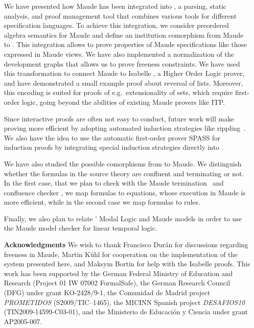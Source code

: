 
We have presented how Maude has been integrated into
\Hets, a parsing, static analysis, and proof management tool that
combines various tools for different specification languages. To
achieve this integration, we consider preordered algebra semantics for
Maude and define an institution comorphism from Maude to \CASL.  This
integration allows to prove properties of Maude specifications like
those expressed in Maude views. We have also implemented a
normalization of the development graphs that allows us to prove
freeness constraints. We have used this transformation to connect
Maude to Isabelle \cite{Isabelle02}, a Higher Order Logic prover, and
have demonstrated a small example proof about reversal of lists.
Moreover, this encoding is suited for proofs of e.g.\ extensionality
of sets, which require first-order logic, going beyond the abilities
of existing Maude provers like ITP.

Since interactive proofs are often not easy to conduct, future work
will make proving more efficient by adopting automated induction
strategies like rippling~\cite{DBLP:conf/tphol/DixonF04}.  We also
have the idea to use the automatic first-order prover SPASS for
induction proofs by integrating special induction strategies directly
into \Hets.

We have also studied the possible comorphisms from \CASL to Maude. We
distinguish whether the formulas in the source theory are confluent and
terminating or not. In the first case, that we plan to check with the
Maude termination~\cite{MTT08} and confluence checker \cite{ChurchRoss10},
we map formulas to equations,
whose execution in Maude is more efficient, while in the second case
we map formulas to rules.

Finally, we also plan to relate \Hets' Modal Logic and Maude models in order to use
the Maude model checker \cite[Chapter 13]{maude-book} for linear temporal
logic.

\vspace{2ex}

\textbf{Acknowledgments} We wish to thank Francisco Dur\'an for discussions 
regarding freeness in Maude, Martin K\"uhl for cooperation
on the implementation of the system presented here,
and Maksym Bortin for help with the Isabelle proofs.
This work has been
supported by the German Federal Ministry of Education and Research
(Project 01 IW 07002 FormalSafe), the German Research Council (DFG)
under grant KO-2428/9-1, the Comunidad de Madrid project \emph{PROMETIDOS}
(S2009/TIC--1465), the MICINN Spanish project
\emph{DESAFIOS10} (TIN2009-14599-C03-01), and the Ministerio de Educaci\'on
y Ciencia under grant AP2005-007.


